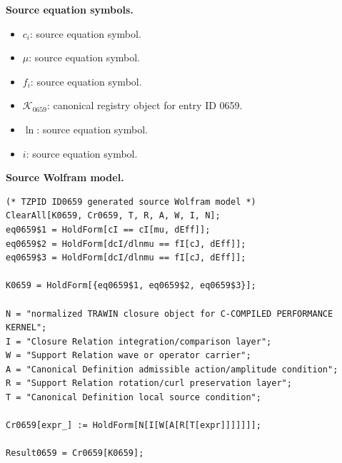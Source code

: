 \begin{minipage}[t]{0.49\linewidth}
\begingroup
\small
\raggedright
\textbf{Source equation symbols.}\par
\begin{itemize}[leftmargin=1.35em,itemsep=1pt,topsep=1pt,parsep=0pt]
    \item $c_i$: source equation symbol.
    \item $\mu$: source equation symbol.
    \item $f_i$: source equation symbol.
    \item $\mathcal{K}_{0659}$: canonical registry object for entry ID 0659.
    \item $\ln$: source equation symbol.
    \item $i$: source equation symbol.
\end{itemize}
\endgroup
\end{minipage}\hfill
\begin{minipage}[t]{0.47\linewidth}
\begingroup
\scriptsize
\raggedright
\textbf{Source Wolfram model.}\par
\begin{Verbatim}[fontsize=\tiny,breaklines=true,breakanywhere=true]
(* TZPID ID0659 generated source Wolfram model *)
ClearAll[K0659, Cr0659, T, R, A, W, I, N];
eq0659$1 = HoldForm[cI == cI[mu, dEff]];
eq0659$2 = HoldForm[dcI/dlnmu == fI[cJ, dEff]];
eq0659$3 = HoldForm[dcI/dlnmu == fI[cJ, dEff]];

K0659 = HoldForm[{eq0659$1, eq0659$2, eq0659$3}];

N = "normalized TRAWIN closure object for C-COMPILED PERFORMANCE KERNEL";
I = "Closure Relation integration/comparison layer";
W = "Support Relation wave or operator carrier";
A = "Canonical Definition admissible action/amplitude condition";
R = "Support Relation rotation/curl preservation layer";
T = "Canonical Definition local source condition";

Cr0659[expr_] := HoldForm[N[I[W[A[R[T[expr]]]]]]];

Result0659 = Cr0659[K0659];
\end{Verbatim}
\endgroup
\end{minipage}

